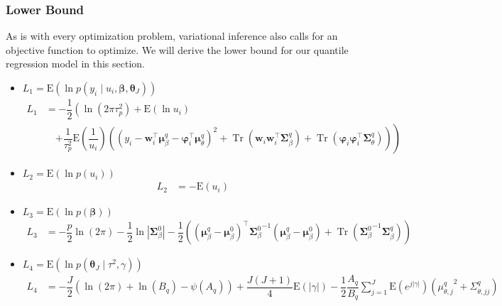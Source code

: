 \documentclass[12pt]{article}
\newcommand{\bs}{\boldsymbol}
\DeclareMathOperator{\Tr}{Tr}
\begin{document}
\subsubsection{Lower Bound}
  As is with every optimization problem, variational inference also calls for an objective function to optimize. We will derive the lower bound for our quantile regression model in this section.
  \begin{itemize}
    \item $L_{1}=\mathrm{E}\left(\ln p\left(y_{i}\;|\;u_{i}, \bs{\beta},\bs{\theta}_{J}\right)\right)$
    \begin{align}
      L_{1} &= -\dfrac{1}{2}\left(\ln\left(2\pi\tau_{p}^{2}\right)+\mathrm{E}\left(\ln u_{i}\right)\right.\\
      &\quad \left.+\dfrac{1}{\tau_{p}^{2}}\mathrm{E}\left(\dfrac{1}{u_{i}}\right)\left(\left(y_{i}-\bs{w}_{i}^{\top}\bs{\mu}_{\beta}^{q}-\bs{\varphi}_{i}^{\top}\bs{\mu}_{\theta}^{q}\right)^{2}+\Tr\left(\bs{w}_{i}\bs{w}_{i}^{\top}\bs{\Sigma}_{\beta}^{q}\right)+\Tr\left(\bs{\varphi}_{i}\bs{\varphi}_{i}^{\top}\bs{\Sigma}_{\theta}^{q}\right) \right)\right)
    \end{align}
    \item $L_{2}=\mathrm{E}\left(\ln p\left(u_{i}\right)\right)$
    \begin{align}
      L_{2} &= -\mathrm{E}\left(u_{i}\right)
    \end{align}
    \item $L_{3}=\mathrm{E}\left(\ln p\left(\bs{\beta}\right)\right)$
    \begin{align}
      L_{3} &= -\dfrac{p}{2}\ln\left(2\pi\right)-\dfrac{1}{2}\ln\left|\bs{\Sigma}_{\beta}^{0}\right| -\dfrac{1}{2}\left(\left(\bs{\mu}_{\beta}^{q}-\bs{\mu}_{\beta}^{0}\right)^{\top}{\bs{\Sigma}_{\beta}^{0}}^{-1}\left(\bs{\mu}_{\beta}^{q}-\bs{\mu}_{\beta}^{0}\right)+\Tr\left({\bs{\Sigma}_{\beta}^{0}}^{-1}\bs{\Sigma}_{\beta}^{q}\right) \right)
    \end{align}
    \item $L_{4}=\mathrm{E}\left(\ln p\left(\bs{\theta}_{J}\;|\;\tau^{2},\gamma\right)\right)$
    \begin{align}
      L_{4} &= -\dfrac{J}{2}\left(\ln\left(2\pi\right)+\ln\left(B_{q}\right)-\psi\left(A_{q}\right)\right)+\dfrac{J\left(J+1\right)}{4}\mathrm{E}\left(\left|\gamma\right|\right)-\dfrac{1}{2}\dfrac{A_{q}}{B_{q}}\sum_{j=1}^{J}\mathrm{E}\left(e^{j\left|\gamma\right|}\right)\left({\mu_{\theta,j}^{q}}^{2}+\Sigma_{\theta,jj}^{q}\right)
    \end{align}

\end{itemize}
\end{document}
